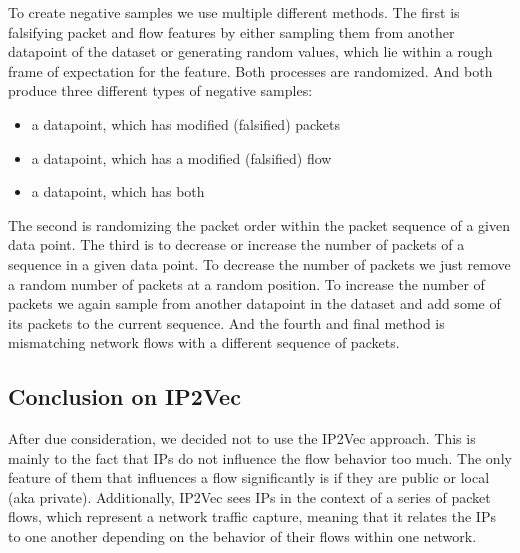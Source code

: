 \documentclass[
	ngerman,
	ruledheaders=section,%
	class=report,%
	thesis={type=bachelor},%
	accentcolor=9c,%
	custommargins=true,%
	marginpar=false,%
	parskip=half-,%
	fontsize=11pt,%
]{tudapub}
\begin{document}
To create negative samples we use multiple different methods.
The first is falsifying packet and flow features by either sampling them from another datapoint of the dataset or generating random values, which lie within a rough frame of expectation for the feature.
Both processes are randomized.
And both produce three different types of negative samples:

\begin{itemize}
    \item a datapoint, which has modified (falsified) packets
    \item a datapoint, which has a modified (falsified) flow
    \item a datapoint, which has both
\end{itemize}

The second is randomizing the packet order within the packet sequence of a given data point.
The third is to decrease or increase the number of packets of a sequence in a given data point.
To decrease the number of packets we just remove a random number of packets at a random position.
To increase the number of packets we again sample from another datapoint in the dataset and add some of its packets to the current sequence.
And the fourth and final method is mismatching network flows with a different sequence of packets.

\subsection{Conclusion on IP2Vec}




After due consideration, we decided not to use the IP2Vec approach.
This is mainly to the fact that IPs do not influence the flow behavior too much.
The only feature of them that influences a flow significantly is if they are public or local (aka private).
Additionally, IP2Vec sees IPs in the context of a series of packet flows, which represent a network traffic capture,
meaning that it relates the IPs to one another depending on the behavior of their flows within one network.
\end{document}
